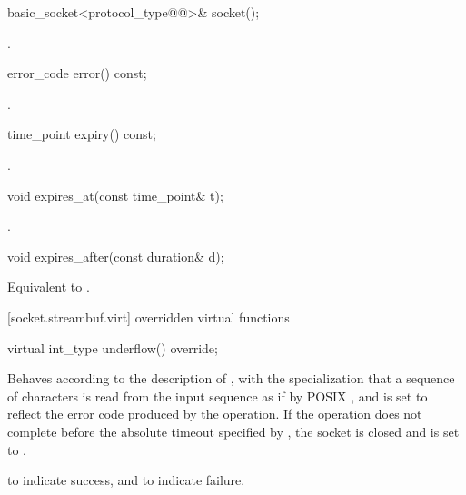 \begin{itemdecl}
basic_socket<protocol_type@@>& socket();
\end{itemdecl}

\begin{itemdescr}
\pnum
\returns {}.
\end{itemdescr}

\begin{itemdecl}
error_code error() const;
\end{itemdecl}

\begin{itemdescr}
\pnum
\returns {}.
\end{itemdescr}

\begin{itemdecl}
time_point expiry() const;
\end{itemdecl}

\begin{itemdescr}
\pnum
\returns {}.
\end{itemdescr}

\begin{itemdecl}
void expires_at(const time_point& t);
\end{itemdecl}

\begin{itemdescr}
\pnum
\postconditions {}.
\end{itemdescr}

\begin{itemdecl}
void expires_after(const duration& d);
\end{itemdecl}

\begin{itemdescr}
\pnum
\effects Equivalent to .
\end{itemdescr}



[socket.streambuf.virt]{ overridden virtual functions}

\begin{itemdecl}
virtual int_type underflow() override;
\end{itemdecl}

\begin{itemdescr}
\pnum
\effects Behaves according to the description of , with the specialization that a sequence of characters is read from the input sequence as if by POSIX , and  is set to reflect the error code produced by the operation. If the operation does not complete before the absolute timeout specified by , the socket is closed and  is set to .

\pnum
\returns {} to indicate success,
and  to indicate failure.
\end{itemdescr}

